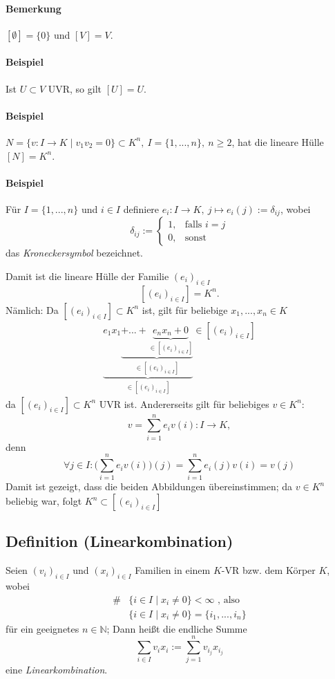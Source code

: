 \paragraph{Bemerkung}
	$[\emptyset ] = \{0\}$ und $[V] = V$.

\paragraph{Beispiel}
	Ist $U\subset V$ UVR, so gilt $[U] = U$.

\paragraph{Beispiel}
	$N=\{v:I\to K\mid v_1v_2=0\} \subset K^n,\ I=\{1,...,n\},\ n\geq 2$, hat die lineare Hülle $[N]=K^n$.

\paragraph{Beispiel}
	Für $I=\{1,...,n\}$ und $i\in I$ definiere
	$e_i:I\to K ,\ j\mapsto e_i(j):= \delta_{ij}$, wobei 
	\begin{equation*}
		\delta_{ij} :=
		\begin{cases}
			1,& \text{falls }i=j\\
			0,& \text{sonst}
		\end{cases}
	\end{equation*}
	das \emph{Kroneckersymbol} bezeichnet.
	
	Damit ist die lineare Hülle der Familie $(e_i)_{i\in I}$
		\[ [(e_i)_{i\in I}] = K^n. \]
	Nämlich: Da $[(e_i)_{i\in I}]\subset K^n$ ist, gilt für beliebige $x_1,...,x_n\in K$
	\begin{gather*}
		\underbrace{e_1x_1\underbrace{+...+\underbrace{e_nx_n + 0}_{\in [(e_i)_{i\in I}]}}_{\in [(e_i)_{i\in I}]}}_{\in [(e_i)_{i\in I}]}\in [(e_i)_{i\in I}]
	\end{gather*}
	da $[(e_i)_{i\in I}] \subset K^n$ UVR ist. 
	Andererseits gilt für beliebiges $v\in K^n$:
		\[ v=\sum^n_{i=1}e_iv(i): I\to K, \]	
	denn
		\[ \forall j\in I: \bigg(\sum^n_{i=1} e_iv(i)\bigg)(j) = \sum^n_{i=1}e_i(j)v(i) = v(j) \]
	Damit ist gezeigt, dass die beiden Abbildungen übereinstimmen; da $v\in K^n$ beliebig war, folgt $K^n \subset [(e_i)_{i\in I}]$
	
\subsection{Definition (Linearkombination)}
	\begin{Definition}
		Seien $(v_i)_{i\in I}$ und $(x_i)_{i\in I}$ Familien in einem $ K $-VR bzw. dem Körper $ K $, wobei
	\begin{align*}
		\# &\{i\in I\mid x_i \neq 0\} < \infty\text{ , also}\\
		   &\{i\in I \mid x_i \neq 0\} = \{i_1,...,i_n\}
        \end{align*}
        für ein geeignetes  $n\in \mathbb{N}$;
    	Dann heißt die endliche Summe
            \[\sum_{i\in I} v_ix_i:= \sum^n_{j=1}v_{i_j}x_{i_j}\]
        eine \emph{Linearkombination}.
	\end{Definition}
	
